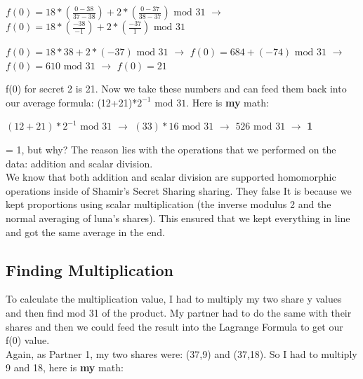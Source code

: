 \documentclass[10pt]{article}
\begin{document}

$f(0) = 18*\left(\frac{0 - 38}{37 - 38}\right) + 2*\left(\frac{0 - 37}{38 - 37}\right) \textrm{ mod } 31$
$\rightarrow$
$f(0) = 18*\left(\frac{-38}{-1}\right) + 2*\left(\frac{-37}{1}\right)  \textrm{ mod } 31$
\vspace{0.1in}

$f(0) = 18*38 + 2*(-37)  \textrm{ mod } 31$
$\rightarrow$
$f(0) = 684 + (-74)  \textrm{ mod } 31$
$\rightarrow$
$f(0) = 610  \textrm{ mod } 31$
$\rightarrow$
$f(0) = 21$
\vspace{0.15in}

\noindent f(0) for secret 2 is 21.  Now we take these numbers and can feed them back into our average formula: (12+21)*$2^{-1} \textrm{ mod } 31$.  Here is \textbf{my} math:\\ \vspace{0.1in}

$\left(12+21\right)*2^{-1} \textrm{ mod } 31$ $\rightarrow$
$\left(33\right)*16 \textrm{ mod } 31$ $\rightarrow$
$526 \textrm{ mod } 31$ $\rightarrow$ \textbf{1}\\
\vspace{0.15in}

 = 1, but why? The reason lies with the operations that we performed on the data: addition and scalar division. \\
We know that both addition and scalar division are supported homomorphic operations inside of Shamir's Secret Sharing sharing. They 
\if false
It is because we kept proportions using scalar multiplication (the inverse modulus 2 and the normal averaging of luna's shares). This ensured that we kept everything in line and got the same average in the end. 
\fi









\vspace{0.2in}
\subsection{Finding Multiplication}
\noindent To calculate the multiplication value, I had to multiply my two share y values and then find mod 31 of the product. My partner had to do the same with their shares and then we could feed the result into the Lagrange Formula to get our f(0) value.\\
Again, as Partner 1, my two shares were: (37,9) and (37,18). 
So I had to multiply 9 and 18, here is \textbf{my} math:\\ \vspace{0.1in}
\end{document}
